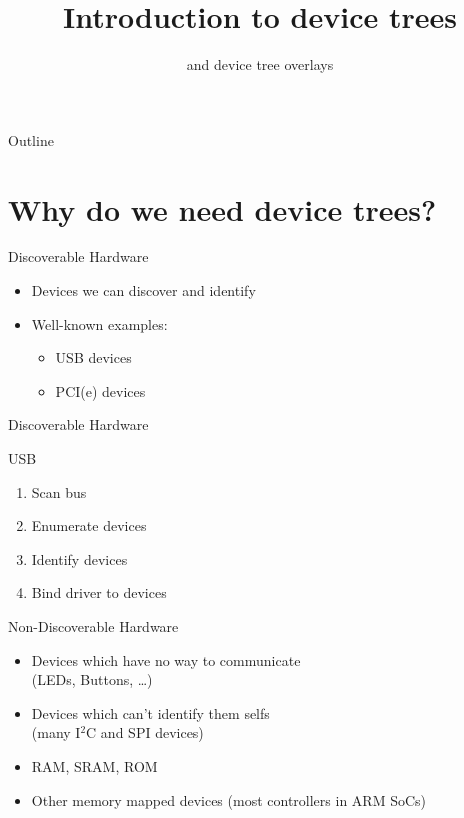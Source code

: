 \documentclass[aspectratio=169]{beamer}
\title {Introduction to device trees}
\subtitle{and device tree overlays}
\begin{document}
\begin{frame}
\titlepage
\end{frame}

\begin{frame}{Outline}
    \tableofcontents
\end{frame}

\section{Why do we need device trees?}
\begin{frame}{Discoverable Hardware}
\begin{itemize}
    \item Devices we can discover and identify
    \item Well-known examples:
    \begin{itemize}
    	\item USB devices
    	\item PCI(e) devices
    \end{itemize}
\end{itemize}
\end{frame}

\begin{frame}{Discoverable Hardware}
\begin{block}{USB}
\begin{enumerate}
	\item Scan bus
	\item Enumerate devices
	\item Identify devices
	\item Bind driver to devices
\end{enumerate}
\end{block}
\end{frame}

\begin{frame}{Non-Discoverable Hardware}
\begin{itemize}
	\item Devices which have no way to communicate\\
	(LEDs, Buttons, \ldots)
	\item Devices which can't identify them selfs\\
	(many I$^2$C and SPI devices)
	\item RAM, SRAM, ROM
    \item Other memory mapped devices (most controllers in ARM SoCs)
\end{itemize}
\end{frame}
\end{document}
